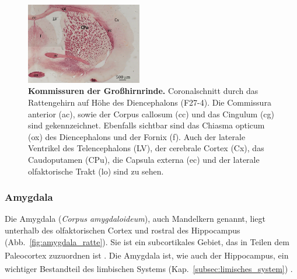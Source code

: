 \begin{figure}[H]
    \centering
    \includegraphics[width=0.45\textwidth]{pictures/Bilder_Jule/Ratte/faser_cortex.png}
    \caption[Kommissuren der Großhirnrinde]{\textbf{Kommissuren der Großhirnrinde.} Coronalschnitt durch das Rattengehirn auf Höhe des Diencephalons (F27-4). Die Commissura anterior (ac), sowie der Corpus callosum (cc) und das Cingulum (cg) sind gekennzeichnet. Ebenfalls sichtbar sind das Chiasma opticum (ox) des Diencephalons und der Fornix (f). Auch der laterale Ventrikel des Telencephalons (LV), der cerebrale Cortex (Cx), das Caudoputamen (CPu), die Capsula externa (ec) und der laterale olfaktorische Trakt (lo) sind zu sehen.}
    \label{fig:faser_cortico-cortical}
\end{figure}

\subsubsection{Amygdala}
\label{subsubsec:Amygdala} 

Die Amygdala (\textit{Corpus amygdaloideum}), auch Mandelkern genannt, liegt unterhalb des olfaktorischen Cortex und rostral des Hippocampus (Abb.~\ref{fig:amygdala_ratte}). Sie ist ein subcortikales Gebiet, das in Teilen dem Paleocortex zuzuordnen ist \textsuperscript{\cite[Kap.~9]{trepel2011neuroanatomie}}. Die Amygdala ist, wie auch der Hippocampus, ein wichtiger Bestandteil des limbischen Systems (Kap.~\ref{subsec:limisches_system}) \textsuperscript{\cite[Kap.~15]{kandel2013principles}}.

